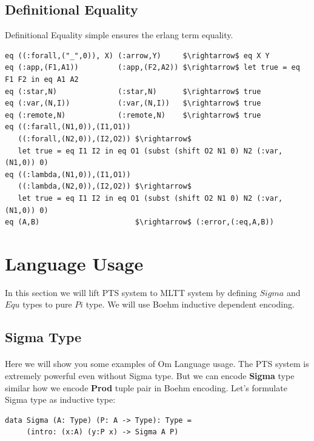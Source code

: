 \documentclass[11pt,oneside]{article}
\begin{document}
\subsection{Definitional Equality}

Definitional Equality simple ensures the erlang term equality.

\begin{lstlisting}[mathescape=true]
eq ((:forall,("_",0)), X) (:arrow,Y)     $\rightarrow$ eq X Y
eq (:app,(F1,A1))         (:app,(F2,A2)) $\rightarrow$ let true = eq F1 F2 in eq A1 A2
eq (:star,N)              (:star,N)      $\rightarrow$ true
eq (:var,(N,I))           (:var,(N,I))   $\rightarrow$ true
eq (:remote,N)            (:remote,N)    $\rightarrow$ true
eq ((:farall,(N1,0)),(I1,O1))
   ((:forall,(N2,0)),(I2,O2)) $\rightarrow$
   let true = eq I1 I2 in eq O1 (subst (shift O2 N1 0) N2 (:var,(N1,0)) 0)
eq ((:lambda,(N1,0)),(I1,O1))
   ((:lambda,(N2,0)),(I2,O2)) $\rightarrow$
   let true = eq I1 I2 in eq O1 (subst (shift O2 N1 0) N2 (:var,(N1,0)) 0)
eq (A,B)                      $\rightarrow$ (:error,(:eq,A,B))
\end{lstlisting}

\newpage
\section{Language Usage}

In this section we will lift PTS system to MLTT system by defining
$Sigma$ and $Equ$ types to pure $Pi$ type. We will use Boehm inductive
dependent encoding.

\subsection{Sigma Type}

\paragraph{}
Here we will show you some examples of Om Language usage.
The PTS system is extremely powerful even without Sigma type. But
we can encode {\bf Sigma} type similar how we encode {\bf Prod}
tuple pair in Boehm encoding. Let's formulate Sigma type as inductive type:

\begin{lstlisting}[mathescape=true]
data Sigma (A: Type) (P: A -> Type): Type =
     (intro: (x:A) (y:P x) -> Sigma A P)
\end{lstlisting}
\end{document}
